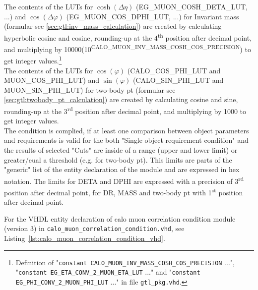 The contents of the LUTs for $\cosh(\Delta\eta)$ (\small{EG\_MUON\_COSH\_DETA\_LUT}\normalsize, ...) and $\cos(\Delta\varphi)$ (\small{EG\_MUON\_COS\_DPHI\_LUT}\normalsize, ...) for Invariant mass (formular see \ref{sec:gtl:inv_mass_calculation}) are created by calculating hyperbolic cosine and cosine, rounding-up at the 4\textsuperscript{th} position after decimal point, and multiplying by 10000(10\textsuperscript{\tiny{CALO\_MUON\_INV\_MASS\_COSH\_COS\_PRECISION}}\normalsize) to get integer values.\footnote{Definition of "\texttt{constant \small{CALO\_MUON\_INV\_MASS\_COSH\_COS\_PRECISION}\normalsize} ...", "\texttt{constant \small{EG\_ETA\_CONV\_2\_MUON\_ETA\_LUT}\normalsize} ..." and "\texttt{constant \small{EG\_PHI\_CONV\_2\_MUON\_PHI\_LUT}\normalsize} ..." in file \texttt{gtl\_pkg.vhd}.}\\
The contents of the LUTs for $\cos(\varphi)$ (\small{CALO\_COS\_PHI\_LUT and MUON\_COS\_PHI\_LUT}\normalsize) and $\sin(\varphi)$ (\small{CALO\_SIN\_PHI\_LUT and MUON\_SIN\_PHI\_LUT}\normalsize) for two-body pt (formular see \ref{sec:gtl:twobody_pt_calculation}) are created by calculating cosine and sine, rounding-up at the 3\textsuperscript{rd} position after decimal point, and multiplying by 1000 to get integer values.\\
The condition is complied, if at least one comparison between object parameters and requirements is valid for the both "Single object requirement condition" and the results of selected "Cuts" are inside of a range (upper and lower limit) or greater/eual a threshold (e.g. for two-body pt). 
This limits are parts of the "generic" list of the entity declaration of the module and are expressed in hex notation. The limits for DETA and DPHI
are expressed with a precision of 3\textsuperscript{rd} position after decimal point, for DR, MASS and two-body pt with 1\textsuperscript{st} position after decimal point.

For the VHDL entity declaration of calo muon correlation condition module (version 3) in \texttt{calo\_muon\_correlation\_condition.vhd}, see Listing~\ref{lst:calo_muon_correlation_condition_vhd}.\\
\clearpage


